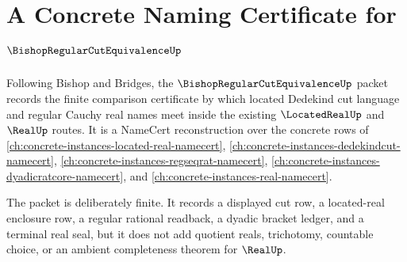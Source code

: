 \chapter{A Concrete Naming Certificate for $\BishopRegularCutEquivalenceUp$}
\label{ch:concrete-instances-bishop-regular-cut-equivalence-namecert}

Following Bishop and Bridges, the $\BishopRegularCutEquivalenceUp$ packet records the finite comparison certificate by which located Dedekind cut language and regular Cauchy real names meet inside the existing $\LocatedRealUp$ and $\RealUp$ routes. It is a NameCert reconstruction over the concrete rows of \autoref{ch:concrete-instances-located-real-namecert}, \autoref{ch:concrete-instances-dedekindcut-namecert}, \autoref{ch:concrete-instances-regseqrat-namecert}, \autoref{ch:concrete-instances-dyadicratcore-namecert}, and \autoref{ch:concrete-instances-real-namecert}.

The packet is deliberately finite. It records a displayed cut row, a located-real enclosure row, a regular rational readback, a dyadic bracket ledger, and a terminal real seal, but it does not add quotient reals, trichotomy, countable choice, or an ambient completeness theorem for $\RealUp$.

